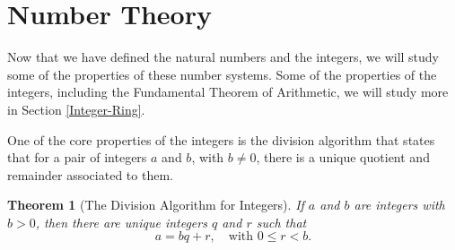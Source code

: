 \documentclass[
]{book}
\newtheorem{theorem}{Theorem}[chapter]
\theoremstyle{definition}
\theoremstyle{definition}
\theoremstyle{definition}
\theoremstyle{definition}
\theoremstyle{remark}
\begin{document}
\hypertarget{numbertheory}{%
\section{Number Theory}\label{numbertheory}}

Now that we have defined the natural numbers and the integers, we will study some of the properties of these number systems. Some of the properties of the integers, including the Fundamental Theorem of Arithmetic, we will study more in Section \ref{Integer-Ring}.

One of the core properties of the integers is the division algorithm that states that for a pair of integers \(a\) and \(b\), with \(b\neq 0\), there is a unique quotient and remainder associated to them.

\begin{theorem}[The Division Algorithm for Integers]
\protect\hypertarget{thm:division-algorithm1}{}\label{thm:division-algorithm1}If \(a\) and \(b\) are integers with \(b>0\), then there are unique integers \(q\) and \(r\) such that \[a=bq+r, \quad \mbox{with } 0\leq r <b.\]
\end{theorem}
\end{document}
